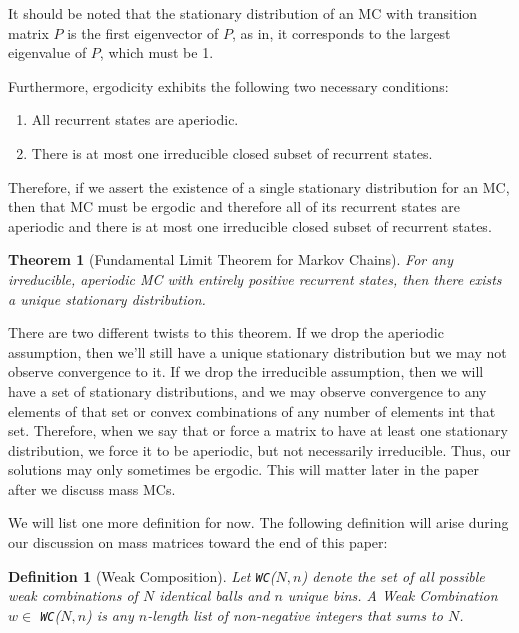\documentclass{article}
\newtheorem{defn}{Definition}
\newtheorem{Theorem}{Theorem}
\begin{document}
It should be noted that the stationary distribution of an MC with transition matrix $P$ is the first eigenvector of $P$, as in, it corresponds to the largest eigenvalue of $P$, which must be 1.

Furthermore, ergodicity exhibits the following two necessary conditions:
\begin{enumerate}
  \item All recurrent states are aperiodic.
  \item There is at most one irreducible closed subset of recurrent states.
\end{enumerate}

\cite{IowaThesis}

Therefore, if we assert the existence of a single stationary distribution for an MC, then that MC must be ergodic and therefore all of its recurrent states are aperiodic and there is at most one irreducible closed subset of recurrent states.

\begin{Theorem}[Fundamental Limit Theorem for Markov Chains]
    For any irreducible, aperiodic MC with entirely positive recurrent states, then there exists a unique stationary distribution. \cite{limitThm}
\end{Theorem}

There are two different twists to this theorem. If we drop the aperiodic assumption, then we'll still have a unique stationary distribution but we may not observe convergence to it. If we drop the irreducible assumption, then we will have a set of stationary distributions, and we may observe convergence to any elements of that set or convex combinations of any number of elements int that set. Therefore, when we say that or force a matrix to have at least one stationary distribution, we force it to be aperiodic, but not necessarily irreducible. Thus, our solutions may only sometimes be ergodic. This will matter later in the paper after we discuss mass MCs.

We will list one more definition for now. The following definition will arise during our discussion on mass matrices toward the end of this paper:

\begin{defn}[Weak Composition]
    Let \textnormal{\texttt{WC}}($N,n$) denote the set of all possible weak combinations of $N$ identical balls and $n$ unique bins. A Weak Combination $w \in $ \textnormal{\texttt{WC}}($N,n$) is any $n$-length list of non-negative integers that sums to $N$.
\end{defn}
\end{document}
